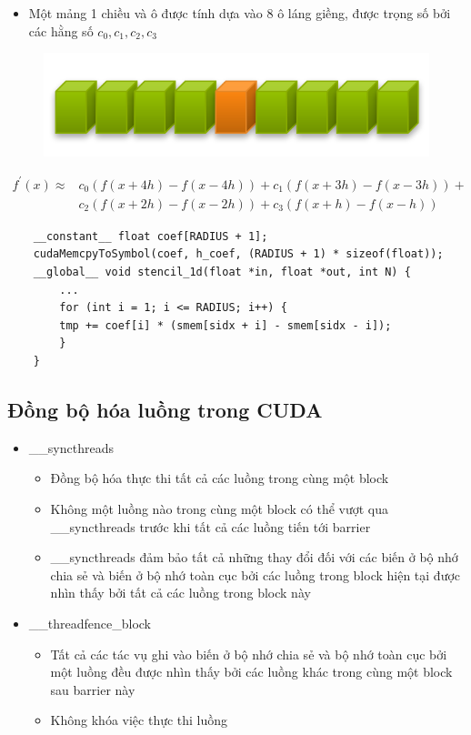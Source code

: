 \documentclass[14pt, a4paper]{article}
\numberwithin{equation}{section}
\numberwithin{figure}{section}
\numberwithin{dl}{section}
\numberwithin{md}{section}
\numberwithin{bd}{section}
\numberwithin{dn}{section}
\numberwithin{hq}{section}
\begin{document}
\begin{itemize}
    \item Một mảng 1 chiều và ô được tính dựa vào 8 ô láng giềng, được trọng số bởi các hằng số $c_0, c_1, c_2, c_3$
\end{itemize}
\begin{figure}[H]
    \centering
    \includegraphics[width=0.5\linewidth]{figures/CUDA/1d_Stencil.png}
\end{figure}
\begin{equation*}
    \begin{aligned}
        f^{\prime}(x) \approx &c_0 (f(x + 4h) - f(x - 4h)) + c_1 (f(x + 3h) - f(x - 3h)) + \\ 
        &c_2 (f(x + 2h) - f(x - 2h)) + c_3 (f(x + h) - f(x - h))
    \end{aligned}
\end{equation*}

\begin{verbatim}
    __constant__ float coef[RADIUS + 1];
    cudaMemcpyToSymbol(coef, h_coef, (RADIUS + 1) * sizeof(float));
    __global__ void stencil_1d(float *in, float *out, int N) {
        ...
        for (int i = 1; i <= RADIUS; i++) {
        tmp += coef[i] * (smem[sidx + i] - smem[sidx - i]);
        }
    } 
\end{verbatim}

\subsection{Đồng bộ hóa luồng trong CUDA}

\begin{itemize}
    \item \_\_syncthreads
    \begin{itemize}
        \item Đồng bộ hóa thực thi tất cả các luồng trong cùng một block
        \item Không một luồng nào trong cùng một block có thể vượt qua \_\_syncthreads trước khi tất cả các luồng tiến tới barrier 
        \item \_\_syncthreads đảm bảo tất cả những thay đổi đối với các biến ở bộ nhớ chia sẻ và biến ở bộ nhớ toàn cục bởi các luồng trong block hiện tại được nhìn thấy bởi tất cả các luồng trong block này
    \end{itemize}
    \item \_\_threadfence\_block
    \begin{itemize}
        \item Tất cả các tác vụ ghi vào biến ở bộ nhớ chia sẻ và bộ nhớ toàn cục bởi một luồng đều được nhìn thấy bởi các luồng khác trong cùng một block sau barrier này
        \item Không khóa việc thực thi luồng
    \end{itemize}
\end{itemize}
\end{document}
